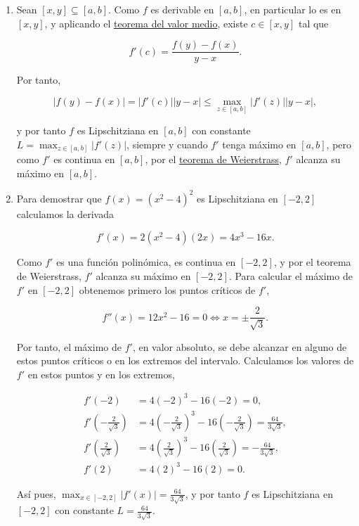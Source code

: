 \documentclass[
  a4paper,
]{scrreport}
\theoremstyle{definition}
\theoremstyle{remark}
\begin{document}
\begin{tcolorbox}[enhanced jigsaw, opacityback=0, colframe=quarto-callout-tip-color-frame, colbacktitle=quarto-callout-tip-color!10!white, titlerule=0mm, bottomtitle=1mm, rightrule=.15mm, arc=.35mm, left=2mm, coltitle=black, title=\textcolor{quarto-callout-tip-color}{\faLightbulb}\hspace{0.5em}{Solución}, bottomrule=.15mm, opacitybacktitle=0.6, breakable, toptitle=1mm, leftrule=.75mm, toprule=.15mm, colback=white]

\begin{enumerate}
\def\labelenumi{\alph{enumi}.}
\item
  Sean \([x,y]\subseteq [a,b]\). Como \(f\) es derivable en \([a,b]\),
  en particular lo es en \([x,y]\), y aplicando el
  \href{https://aprendeconalf.es/analisis-manual/07-derivadas.html\#thm-valor-medio}{teorema
  del valor medio}, existe \(c\in[x,y]\) tal que

  \[
  f'(c) = \frac{f(y)-f(x)}{y-x}.
  \]

  Por tanto,

  \[
  |f(y)-f(x)| = |f'(c)||y-x| \leq \max_{z\in [a,b]}|f'(z)||y-x|,
  \]

  y por tanto \(f\) es Lipschitziana en \([a,b]\) con constante
  \(L=\max_{z\in [a,b]}|f'(z)|\), siempre y cuando \(f'\) tenga máximo
  en \([a,b]\), pero como \(f'\) es continua en \([a,b]\), por el
  \href{https://aprendeconalf.es/analisis-manual/06-limites.html\#thm-weierstrass}{teorema
  de Weierstrass}, \(f'\) alcanza su máximo en \([a,b]\).
\item
  Para demostrar que \(f(x) = (x^2-4)^2\) es Lipschitziana en \([-2,2]\)
  calculamos la derivada

  \[
  f'(x) = 2(x^2-4)(2x) = 4x^3-16x.
  \]

  Como \(f'\) es una función polinómica, es continua en \([-2,2]\), y
  por el teorema de Weierstrass, \(f'\) alcanza su máximo en \([-2,2]\).
  Para calcular el máximo de \(f'\) en \([-2,2]\) obtenemos primero los
  puntos críticos de \(f'\),

  \[
  f''(x) = 12x^2-16 = 0 \Leftrightarrow x = \pm\frac{2}{\sqrt{3}}.
  \]

  Por tanto, el máximo de \(f'\), en valor absoluto, se debe alcanzar en
  alguno de estos puntos críticos o en los extremos del intervalo.
  Calculamos los valores de \(f'\) en estos puntos y en los extremos,

  \begin{align*}
  f'(-2) &= 4(-2)^3-16(-2) = 0,\\
  f'\left(-\frac{2}{\sqrt{3}}\right) &= 4\left(-\frac{2}{\sqrt{3}}\right)^3-16\left(-\frac{2}{\sqrt{3}}\right) = \frac{64}{3\sqrt{3}},\\
  f'\left(\frac{2}{\sqrt{3}}\right) &= 4\left(\frac{2}{\sqrt{3}}\right)^3-16\left(\frac{2}{\sqrt{3}}\right) = -\frac{64}{3\sqrt{3}},\\
  f'(2) &= 4(2)^3-16(2) = 0.
  \end{align*}

  Así pues, \(\max_{x\in[-2,2]}|f'(x)| = \frac{64}{3\sqrt{3}}\), y por
  tanto \(f\) es Lipschitziana en \([-2,2]\) con constante
  \(L=\frac{64}{3\sqrt{3}}\).
\end{enumerate}

\end{tcolorbox}
\end{document}
